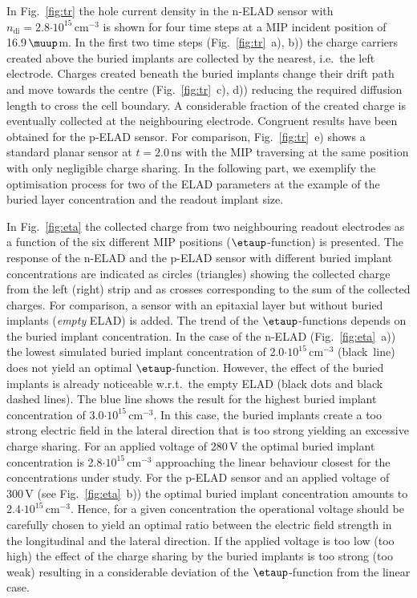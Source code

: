\documentclass[a4paper,11pt]{article}
\begin{document}
In Fig.~\ref{fig:tr} the hole current density in the n-ELAD sensor with $n\mathrm{_{di}} = 2.8\mathrm{\cdot10^{15}\,cm^{-3}}$ is shown for four time steps at a MIP incident position of 16.9\,$\muup$m.
In the first two time steps (Fig.~\ref{fig:tr}~a), b)) the charge carriers created above the buried implants are collected by the nearest, i.e.\ the left electrode.
Charges created beneath the buried implants change their drift path and move towards the centre (Fig.~\ref{fig:tr}~c), d)) reducing the required diffusion length to cross the cell boundary.
A considerable fraction of the created charge is eventually collected at the neighbouring electrode. 
Congruent results have been obtained for the p-ELAD sensor.
For comparison, Fig.~\ref{fig:tr}~e) shows a standard planar sensor at $t = 2.0\,$ns with the MIP traversing at the same position with only negligible charge sharing.
In the following part, we exemplify the optimisation process for two of the ELAD parameters at the example of the buried layer concentration and the readout implant size. 

In Fig.~\ref{fig:eta} the collected charge from two neighbouring readout electrodes as a function of the six different MIP positions ($\etaup$-function) is presented.
The response of the n-ELAD and the p-ELAD sensor with different buried implant concentrations are indicated as
 circles (triangles) showing the collected charge from the left (right) strip
 and as crosses corresponding to the sum of the collected charges. 
For comparison, a sensor with an epitaxial layer but without buried implants (\textit{empty} ELAD) is added. 
The trend of the $\etaup$-functions depends on the buried implant concentration.
In the case of the n-ELAD (Fig.~\ref{fig:eta}~a)) the lowest simulated buried implant concentration of 2.0$\mathrm{\cdot10^{15}\,cm^{-3}}$ (black~line) does not yield an optimal $\etaup$-function.
However, the effect of the buried implants is already noticeable w.r.t.\ the empty ELAD (black dots and black dashed lines). 
The blue line shows the result for the highest buried implant concentration of 3.0$\mathrm{\cdot10^{15}\,cm^{-3}}$. 
In this case, the buried implants create a too strong electric field in the lateral direction that is too strong yielding an excessive charge sharing.
For an applied voltage of 280\,V the optimal buried implant concentration is 2.8$\mathrm{\cdot10^{15}\,cm^{-3}}$ approaching the linear behaviour closest for the concentrations under study.
For the p-ELAD sensor and an applied voltage of 300\,V (see Fig.~\ref{fig:eta}~b)) the optimal buried implant concentration amounts to 2.4$\mathrm{\cdot10^{15}\,cm^{-3}}$.
Hence, for a given concentration the operational voltage should be carefully chosen to yield an optimal ratio between the electric field strength in the longitudinal and the lateral direction. 
If the applied voltage is too low (too high) the effect of the charge sharing by the buried implants is too strong (too weak) resulting in a considerable deviation of the $\etaup$-function from the linear case.
\end{document}
